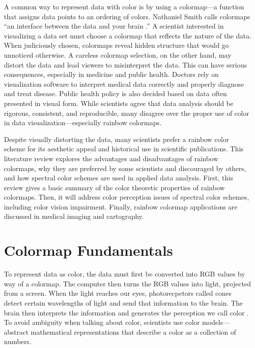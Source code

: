 \documentclass[journal]{IEEEtran}
\begin{document}
A common way to represent data with color is by using a
colormap---a function that assigns data points to
an ordering of colors. Nathaniel Smith
calls colormaps ``an interface between the data and your
brain \cite{viridis}.'' A scientist interested in visualizing a
data set must choose a colormap that reflects the nature of the data. 
When judiciously chosen, colormaps reveal hidden structure that would go unnoticed
otherwise. A careless colormap selection, on the other hand, may distort the data and
lead viewers to misinterpret the data. This can have
serious consequences, especially in medicine and public health.
Doctors rely on visualization software to interpret medical
data correctly and properly diagnose and treat disease.
Public health policy is also decided based on data often presented 
in visual form. While scientists agree that data analysis
should be rigorous, consistent, and reproducible, many disagree over the proper
use of color in data visualization---especially rainbow colormaps.

Despite visually distorting the data, many scientists
prefer a rainbow color scheme for its aesthetic appeal
and historical use in scientific publications. This literature
review explores the advantages and disadvantages
of rainbow colormaps, why they are preferred by some
scientists and discouraged by others, and how spectral color schemes are used
in applied data analysis. First, this review gives a basic summary 
of the color theoretic properties of rainbow colormaps. Then, it will
address color perception issues of spectral color schemes, including
color vision impairment. Finally, rainbow colormap applications are discussed
in medical imaging and cartography.

\section{Colormap Fundamentals}

To represent data as color, the data must first be converted into RGB values by way of 
a colormap. The computer then turns the RGB values into light, projected from a screen.
When the light reaches our eyes, photorecpetors called cones detect certain wavelengths
of light and send that information to the brain. The brain then interprets the information
and generates the perception we call color \cite{viridis}.
To avoid ambiguity when talking about color, scientists use
color models---abstract mathematical representations that
describe a color as a collection of numbers.
\end{document}
